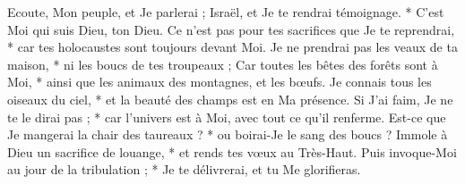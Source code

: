  Ecoute, Mon peuple, et Je parlerai ; Israël, et Je te rendrai témoignage. * C'est Moi qui suis Dieu, ton Dieu.
\versseparator
 Ce n'est pas pour tes sacrifices que Je te reprendrai, * car tes holocaustes sont toujours devant Moi.
\versseparator
 Je ne prendrai pas les veaux de ta maison, * ni les boucs de tes troupeaux ;
\versseparator
 Car toutes les bêtes des forêts sont à Moi, * ainsi que les animaux des montagnes, et les bœufs.
\versseparator
 Je connais tous les oiseaux du ciel, * et la beauté des champs est en Ma présence.
\versseparator
 Si J'ai faim, Je ne te le dirai pas ; * car l'univers est à Moi, avec tout ce qu'il renferme.
\versseparator
 Est-ce que Je mangerai la chair des taureaux ? * ou boirai-Je le sang des boucs ?
\versseparator
 Immole à Dieu un sacrifice de louange, * et rends tes vœux au Très-Haut.
\versseparator
 Puis invoque-Moi au jour de la tribulation ; * Je te délivrerai, et tu Me glorifieras.